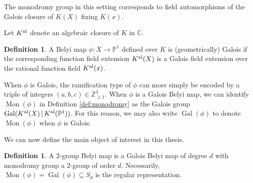 \documentclass{dcthesis}
\newcommand{\PP}{\mathbb P}
\newcommand{\CC}{\mathbb C}
\newcommand{\ZZ}{\mathbb Z}
\newcommand{\defi}[1]{\textsf{#1}}
\newcommand{\Kal}{{{K}^{\textup{al}}}}
\DeclareMathOperator{\Aut}{Aut}
\DeclareMathOperator{\Mon}{Mon}
\DeclareMathOperator{\Gal}{Gal}
\numberwithin{equation}{section}
\newtheorem{prop}[equation]{Proposition}
\theoremstyle{definition}
\newtheorem{definition}[equation]{Definition}
\theoremstyle{remark}
\begin{document}
{{{    The monodromy group in this setting
    corresponds to field automorphisms
    of the Galois closure of $K(X)$
    fixing $K(x)$.
    \par
    Let $\Kal$
    denote an algebraic closure of $K$ in $\CC$.
    \begin{definition}\label{def:galoisbelyi}
      A Belyi map $\phi\colon X\to\PP^1$
      defined over $K$
      is \defi{(geometrically) Galois}
      if the corresponding
      function field extension
      $\Kal(X)$ is a Galois field extension
      over the rational function field
      $\Kal(x)$.
    \end{definition}
    When $\phi$ is Galois,
    the ramification type of
    $\phi$ can more simply be encoded by
    a triple of integers
    $(a,b,c)\in\ZZ_{\geq 1}^3$.
    When $\phi$ is a Galois Belyi map,
    we can identify $\Mon(\phi)$
    in Definition \ref{def:monodromy}
    as the Galois group
    $\Gal(\Kal(X)\,|\,\Kal(\PP^1))$.
    For this reason,
    we may also write $\Gal(\phi)$
    to denote $\Mon(\phi)$ when $\phi$
    is Galois.
    \par
    We can now define the main object of
    interest in this thesis.
    \begin{definition}
      \label{def:2gbm}
      A \defi{$2$-group Belyi map}
      is a Galois Belyi map
      of degree $d$
      with monodromy group a
      $2$-group of order $d$.
      Necessarily,
      $\Mon(\phi)=\Gal(\phi)\subseteq S_d$
      is the regular representation.
    \end{definition}
}}}
\end{document}
